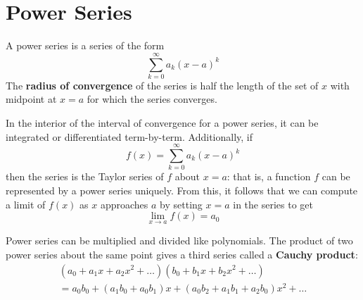 \documentclass[11pt]{article}
\begin{document}
\section{Power Series}
	A power series is a series of the form
	\begin{equation}
		\sum_{k=0}^\infty a_k (x-a)^k
	\end{equation}
	The \textbf{radius of convergence} of the series is half the length of the set of $x$ with midpoint at $x=a$ for which the series converges.
	
	In the interior of the interval of convergence for a power series, it can be integrated or differentiated term-by-term.  Additionally, if
	\begin{equation}
		f(x) = \sum_{k=0}^\infty a_k (x-a)^k
	\end{equation}
	then the series is the Taylor series of $f$ about $x=a$: that is, a function $f$ can be represented by a power series uniquely. From this, it follows that we can compute a limit of $f(x)$ as $x$ approaches $a$ by setting $x=a$ in the series to get
	\begin{equation}
		\lim_{x\rightarrow a} f(x) = a_0
	\end{equation}
	
	Power series can be multiplied and divided like polynomials. The product of two power series about the same point gives a third series called a \textbf{Cauchy product}:
	\begin{eqnarray}
		(a_0 + a_1 x + a_2 x^2 + \ldots)(b_0 + b_1 x + b_2 x^2 + \ldots)\\
		= a_0b_0 + (a_1b_0 + a_0b_1)x + (a_0b_2 + a_1b_1 + a_2b_0)x^2 + \ldots
	\end{eqnarray}

%		
%		


\end{document}
